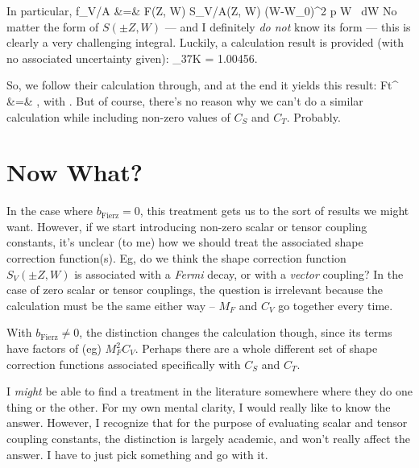 In particular, 
\bea
f_{V/A} &=& \int F(\pm Z, W) S_{V/A}(\pm Z, W) (W-W_0)^2 p W \, dW
\eea
No matter the form of $S(\pm Z, W)$ --- and I definitely \emph{do not} know its form --- this is clearly a very challenging integral.  Luckily, a calculation result is provided (with no associated uncertainty given): 
\bea
{}  \biggm\lvert _{37K} = 1.00456.
\eea

So, we follow their calculation through, and at the end it yields this result:
\bea
Ft^{} &=& , 
\eea
with
\bea
\rho \approx {}.
\eea
But of course, there's no reason why we can't do a similar calculation while including non-zero values of $C_S$ and $C_T$.  Probably.

\section[Now What?]{Now What?}

In the case where $b_{\mathrm{Fierz}} = 0$, this treatment gets us to the sort of results we might want.  However, if we start introducing non-zero scalar or tensor coupling constants, it's unclear (to me) how we should treat the associated shape correction function(s).  Eg, do we think the shape correction function $S_{V}(\pm Z, W)$ is associated with a \emph{Fermi} decay, or with a \emph{vector} coupling?  In the case of %
zero scalar or tensor couplings, the question is irrelevant because the calculation must be the same either way -- $M_F$ and $C_V$ go together every time. 

With $b_{\mathrm{Fierz}} \neq 0$, the distinction changes the calculation though, since its terms have factors of (eg) $M_F^2 C_V$.
Perhaps there are a whole different set of shape correction functions associated specifically with $C_S$ and $C_T$.  

I \emph{might} be able to find a treatment in the literature somewhere where they do one thing or the other.  For my own mental clarity, I would really like to know the answer.  However, I recognize that for the purpose of evaluating scalar and tensor coupling constants, the distinction is largely academic, and won't really affect the answer.  I have to just pick something and go with it.  

